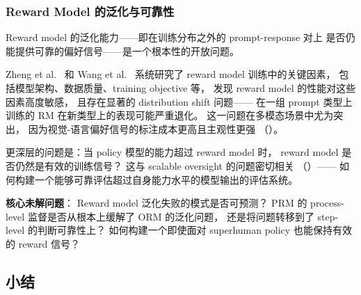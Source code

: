 \subsubsection{Reward Model 的泛化与可靠性}
\label{sec:t2-rm-generalization}

Reward model 的泛化能力——即在训练分布之外的 prompt-response 对上
是否仍能提供可靠的偏好信号——是一个根本性的开放问题。

Zheng et al.\ \cite{zheng2023secrets1} 和 Wang et al.\ \cite{wang2024secrets2}
系统研究了 reward model 训练中的关键因素，
包括模型架构、数据质量、training objective 等，
发现 reward model 的性能对这些因素高度敏感，
且存在显著的 distribution shift 问题——
在一组 prompt 类型上训练的 RM 在新类型上的表现可能严重退化。
这一问题在多模态场景中尤为突出，
因为视觉-语言偏好信号的标注成本更高且主观性更强
（）。

更深层的问题是：当 policy 模型的能力超过 reward model 时，
reward model 是否仍然是有效的训练信号？
这与 scalable oversight 的问题密切相关
（）——
如何构建一个能够可靠评估超过自身能力水平的模型输出的评估系统。

\begin{openproblembox}
\textbf{核心未解问题}：
Reward model 泛化失败的模式是否可预测？
PRM 的 process-level 监督是否从根本上缓解了 ORM 的泛化问题，
还是将问题转移到了 step-level 的判断可靠性上？
如何构建一个即使面对 superhuman policy 也能保持有效的 reward 信号？
\end{openproblembox}

\subsection{小结}

